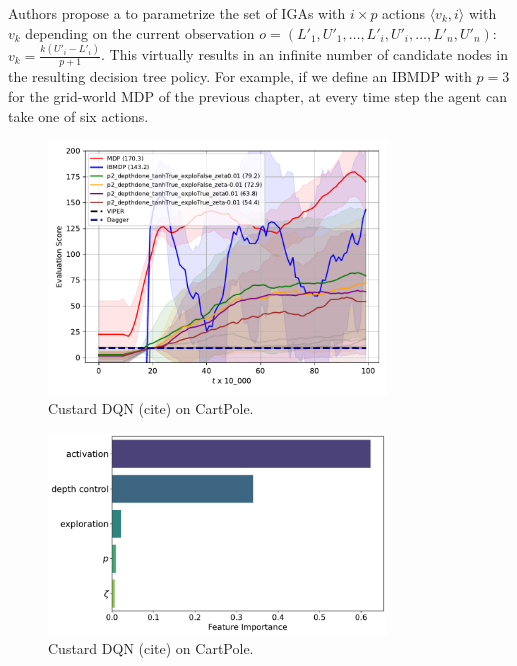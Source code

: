 Authors propose a to parametrize the set of IGAs with $i \times p$ actions $\langle v_k, i \rangle$ with $v_k$ depending on the current observation $o=(L'_1, U'_1, \dots, L'_i, U'_i, \dots, L'_n, U'_n)$: $v_k = \frac{k(U'_i - L'_i)}{p+1}$.
This virtually results in an infinite number of candidate nodes in the resulting decision tree policy.
For example, if we define an IBMDP with $p=3$ for the grid-world MDP of the previous chapter, at every time step the agent can take one of six actions.
\begin{figure}
    \centering
    \includegraphics[width=0.8\textwidth]{images/images_part1/dqn.pdf}
    \caption{Custard DQN (cite) on CartPole.}
\end{figure}

\begin{figure}
    \centering
    \includegraphics[width=0.8\textwidth]{images/images_part1/hyperparameter_importance_dqn.pdf}
    \caption{Custard DQN (cite) on CartPole.}
\end{figure}

